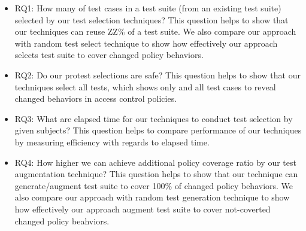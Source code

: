 \begin{itemize}


	\item RQ1: How many of test cases in a test suite (from an existing test suite) selected by our test selection techniques? This question helps to show that our techniques can reuse ZZ\% of a test suite. We also compare our approach with random test select technique to show how effectively our approach selects test suite to cover changed policy behaviors.
	
	\item RQ2: Do our protest selections are safe? This question helps to show that our techniques select all tests, which shows only and all test cases to reveal changed behaviors in access control policies.
	
	\item RQ3: What are elapsed time for our techniques to conduct test selection by given subjects? This question helps to compare performance of our techniques by measuring
	efficiency with regards to elapsed time.
			
	\item RQ4: How higher we can achieve additional policy coverage ratio by our test augmentation technique?  This question helps to show that our technique can generate/augment test suite to cover 100\% of changed policy behaviors. We also compare our approach with random test generation technique to show how effectively our approach augment test suite to cover not-coverted changed policy beahviors.
			


\end{itemize}
